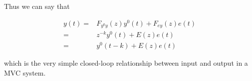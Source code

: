 Thus we can say that

\begin{align*}
	y(t) =& F_{y^0y}(z) y^0(t) + F_{ey}(z) e(t) \\
		 =& z^{-k} y^0(t) + E(z) e(t) \\
         =& y^0(t-k) + E(z) e(t)
\end{align*}
 
which is the very simple closed-loop relationship between input and output in a MVC system.


